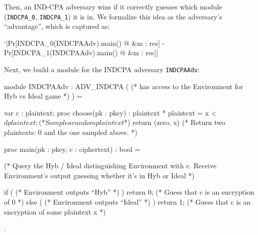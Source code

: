 \documentclass{article}[12pt]
\newcommand{\code}[1]{\texttt{#1}} %
\begin{document}
Then, an IND-CPA adversary wins if it correctly guesses which module (\code{INDCPA\_0}, \code{INDCPA\_1}) it is in. We formalize this idea as the adversary's ``advantage'', which is captured as:

\begin{easycrypt}
`|Pr[INDCPA_0(INDCPAAdv).main() @ &m : res] - Pr[INDCPA_1(INDCPAAdv).main() @ &m : res]|
\end{easycrypt}

Next, we build a module for the INDCPA adversary \code{INDCPAAdv}:

\begin{easycrypt}
module INDCPAAdv : ADV_INDCPA ( (* has access to the Environment for Hyb vs Ideal game *) ) = {
	var c : plaintext;
	proc choose(pk : pkey) : plaintext * plaintext = {
		x <$ dplaintext;	(* Sample a random plaintext $*)
		return (zero, x)	(* Return two plaintexts: 0 and the one sampled above. *)
	}

	proc main(pk : pkey, c : ciphertext) : bool = {
		(* Query the Hyb / Ideal distinguishing Environment with c. Receive Environment's output guessing whether it's in Hyb or Ideal *)

		if ( (* Environment outputs ``Hyb'' *) ) {
			return 0;	(* Guess that c is an encryption of 0 *)
		}
		else ( (* Environment outputs ``Ideal'' *) ) {
			return 1;	(* Guess that c is an encryption of some plaintext x *)
		}

	}
}.
\end{easycrypt}

{\small{


}}
\end{document}
